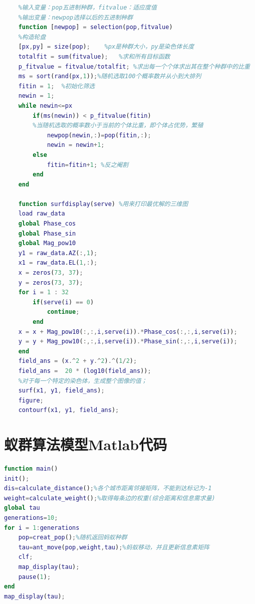 \documentclass[UTF8,12pt]{ctexart}
\begin{document}
\begin{appendices}
\begin{scriptsize}
\begin{lstlisting}[language=Matlab]
    %如何选择新的个体
    %输入变量：pop五进制种群，fitvalue：适应度值
    %输出变量：newpop选择以后的五进制种群
    function [newpop] = selection(pop,fitvalue)
    %构造轮盘
    [px,py] = size(pop);    %px是种群大小，py是染色体长度
    totalfit = sum(fitvalue);   %求和所有目标函数
    p_fitvalue = fitvalue/totalfit; %求出每一个个体求出其在整个种群中的比重
    ms = sort(rand(px,1));%随机选取100个概率数并从小到大排列
    fitin = 1;  %初始化筛选
    newin = 1;
    while newin<=px
        if(ms(newin)) < p_fitvalue(fitin) 
        %当随机选取的概率数小于当前的个体比重，即个体占优势，繁殖
            newpop(newin,:)=pop(fitin,:); 
            newin = newin+1;
        else
            fitin=fitin+1; %反之阉割
        end
    end
    
    function surfdisplay(serve) %用来打印最优解的三维图
    load raw_data
    global Phase_cos
    global Phase_sin
    global Mag_pow10
    y1 = raw_data.AZ(:,1);
    x1 = raw_data.EL(1,:);
    x = zeros(73, 37);
    y = zeros(73, 37);
    for i = 1 : 32
        if(serve(i) == 0) 
            continue;
        end
    x = x + Mag_pow10(:,:,i,serve(i)).*Phase_cos(:,:,i,serve(i));
    y = y + Mag_pow10(:,:,i,serve(i)).*Phase_sin(:,:,i,serve(i));
    end
    field_ans = (x.^2 + y.^2).^(1/2);
    field_ans =  20 * (log10(field_ans));    
    %对于每一个特定的染色体，生成整个图像的值；
    surf(x1, y1, field_ans);
    figure;
    contourf(x1, y1, field_ans);
\end{lstlisting}
\end{scriptsize}

    

    \section{蚁群算法模型Matlab代码}
    \begin{scriptsize}
        \begin{lstlisting}[language=Matlab]
    function main()
init();
dis=calculate_distance();%各个城市距离邻接矩阵，不能到达标记为-1
weight=calculate_weight();%取得每条边的权重(综合距离和信息需求量)
global tau
generations=10;
for i = 1:generations
    pop=creat_pop();%随机返回蚂蚁种群
    tau=ant_move(pop,weight,tau);%蚂蚁移动，并且更新信息素矩阵
    clf;
    map_display(tau);
    pause(1);
end
map_display(tau);
    

\end{lstlisting}
\end{scriptsize}
\end{appendices}
\end{document}
